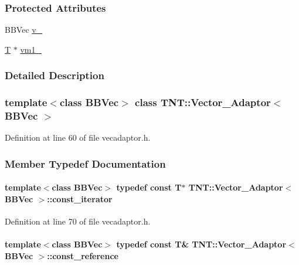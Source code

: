 \subsubsection*{Protected Attributes}
\begin{DoxyCompactItemize}
\item 
BBVec \hyperlink{class_t_n_t_1_1_vector___adaptor_a5efb88304efafdc1f1bb4ffa4fa71d27}{v\_\-}
\item 
\hyperlink{class_t_n_t_1_1_vector___adaptor_a8f689dfb94d76130f5327e00f2d10b97}{T} $\ast$ \hyperlink{class_t_n_t_1_1_vector___adaptor_ae5ca6c14a440c4bcddb0d9114222d946}{vm1\_\-}
\end{DoxyCompactItemize}


\subsubsection{Detailed Description}
\subsubsection*{template$<$class BBVec$>$ class TNT::Vector\_\-Adaptor$<$ BBVec $>$}



Definition at line 60 of file vecadaptor.h.



\subsubsection{Member Typedef Documentation}
\paragraph[{const\_\-iterator}]{\setlength{\rightskip}{0pt plus 5cm}template$<$class BBVec$>$ typedef const {\bf T}$\ast$ {\bf TNT::Vector\_\-Adaptor}$<$ BBVec $>$::{\bf const\_\-iterator}}\hfill\label{class_t_n_t_1_1_vector___adaptor_a4dac0b1b3dacfbba4dc6fdd9bec7eef0}


Definition at line 70 of file vecadaptor.h.

\paragraph[{const\_\-reference}]{\setlength{\rightskip}{0pt plus 5cm}template$<$class BBVec$>$ typedef const {\bf T}\& {\bf TNT::Vector\_\-Adaptor}$<$ BBVec $>$::{\bf const\_\-reference}}\hfill\label{class_t_n_t_1_1_vector___adaptor_aa1387887d6104a4256a80106d145afa0}


